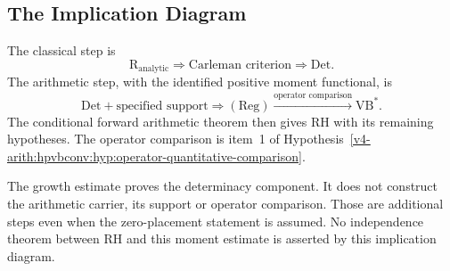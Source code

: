 \subsection{The Implication Diagram}
\label{v4-arith:r-comparison:corrected-chain}
\begin{remark}
\label{v4-arith:r-comparison:diag:chain}
The classical step is
\[
 \mathrm R_{\mathrm{analytic}}\Longrightarrow
 \text{Carleman criterion}\Longrightarrow\mathrm{Det}.
\]
The arithmetic step, with the identified positive moment functional,
is
\[
 \mathrm{Det}+\text{specified support}
 \Longrightarrow(\mathrm{Reg})
 \xrightarrow{\text{operator comparison}}\mathrm{VB}^{*}.
\]
The conditional forward arithmetic theorem then gives RH with its
remaining hypotheses. The operator comparison is item~1 of
Hypothesis~\ref{v4-arith:hpvbconv:hyp:operator-quantitative-comparison}.
\end{remark}
\begin{remark}
\label{v4-arith:r-comparison:rem:closes-converse}
The growth estimate proves the determinacy component. It does not
construct the arithmetic carrier, its support or operator comparison.
Those are additional steps even when the zero-placement statement
is assumed. No independence theorem between RH and this moment
estimate is asserted by this implication diagram.
\end{remark}


